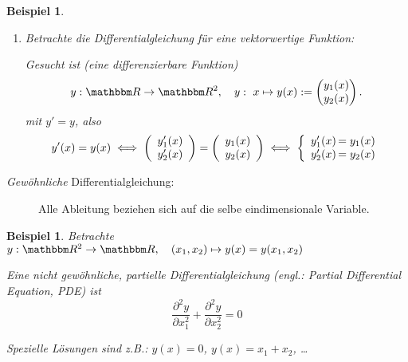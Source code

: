 \documentclass[12pt,a4paper]{book}
\theoremstyle{break}
\newtheorem{beispiel}[theorem]{Beispiel}
\theoremstyle{nonumberplain}
\newcommand{\R}{\mathbbm R}
\newcommand{\1}{\mathbbm{1}} 			      	%
\begin{document}
\begin{beispiel}
\begin{enumerate}
\begin{itemize}
\begin{align*}
y_1(x)& = \sin(x)\\
y_2(x)& = 37\\
y_3(x)& = 0
\end{align*}
\item Die \emph{allgemeine} Lösung ist
\begin{align*}
y_1(x)& = C_1 \sin(x) + C_2 \cos(x)\\
y_2(x)& = C_3 e^x+C_4\\
y_3(x)& = C_3 e^x\\
\end{align*}
mit $C_1,\ldots,C_4\in \R.$
\end{itemize}
%
\item[(e)] Betrachte die Differentialgleichung für eine \emph{vektorwertige} Funktion:

Gesucht ist (eine differenzierbare Funktion) 
\[
y: \R \to \R^2,\quad y:\ x\mapsto y(x):=\begin{pmatrix} y_1(x)\\ y_2(x) \end{pmatrix}.
\]
mit $y'=y$, also
\[
y'(x)=y(x) \;  \Longleftrightarrow \;
\left( \begin{array}{c} y_1'(x)\\ y_2'(x) \end{array} \right)= \left( \begin{array}{c} y_1(x)\\ y_2(x) \end{array} \right)
\;  \Longleftrightarrow \;
\left\{ \begin{array}{r@{\,}  l}
y_1'(x)&=y_1(x)\\  y_2'(x)&=y_2(x)
\end{array} \right.
\]
\end{enumerate}
\end{beispiel}



\begin{description}
\item[\emph{Gewöhnliche} Differentialgleichung:] Alle Ableitung beziehen sich auf die selbe eindimensionale Variable.
\end{description}

\begin{beispiel}
Betrachte $y:\R^2 \to \R, \quad (x_1,x_2)\mapsto y(x)=y(x_1,x_2)$

Eine nicht gewöhnliche, \emph{partielle} Differentialgleichung (engl.: Partial Differential Equation, PDE) ist 
\[
\frac{\partial^2 y}{\partial x_1^2}+\frac{\partial^2 y}{\partial x_2^2}=0
\]

\emph{Spezielle} Lösungen sind z.B.:  $y(x)=0$, $y(x)=x_1+x_2$, \ldots
\end{beispiel}
\end{document}

